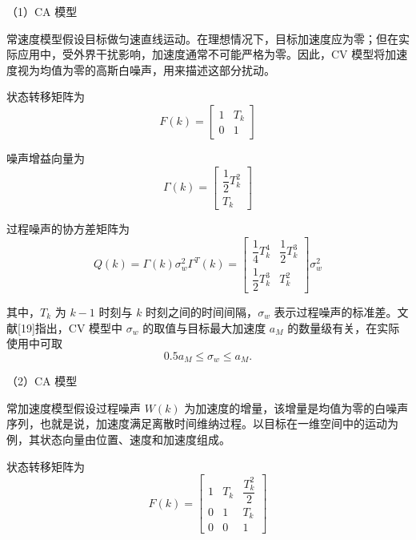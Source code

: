 \documentclass{xdupgthesis}
\begin{document}
\textnormal{（1）CA 模型}\par\vspace{0.3\baselineskip}

常速度模型假设目标做匀速直线运动。在理想情况下，目标加速度应为零；但在实际应用中，受外界干扰影响，加速度通常不可能严格为零。因此，CV 模型将加速度视为均值为零的高斯白噪声，用来描述这部分扰动。

状态转移矩阵为
\begin{equation}
	F(k)=
	\begin{bmatrix}
		1 & T_k\\
		0 & 1
	\end{bmatrix}
\end{equation}

噪声增益向量为
\begin{equation}
	\Gamma(k)=
	\begin{bmatrix}
		\dfrac{1}{2}T_k^2\\
		T_k
	\end{bmatrix}
\end{equation}

过程噪声的协方差矩阵为
\begin{equation}
	Q(k)=\Gamma(k)\sigma_w^2\Gamma^{T}(k)=
	\begin{bmatrix}
		\dfrac{1}{4}T_k^4 & \dfrac{1}{2}T_k^3\\[6pt]
		\dfrac{1}{2}T_k^3 & T_k^2
	\end{bmatrix}\sigma_w^2
\end{equation}

其中，$T_k$ 为 $k-1$ 时刻与 $k$ 时刻之间的时间间隔，$\sigma_w$ 表示过程噪声的标准差。文献[19]指出，CV 模型中 $\sigma_w$ 的取值与目标最大加速度 $a_M$ 的数量级有关，在实际使用中可取
\[
0.5a_M \leq \sigma_w \leq a_M.
\]

\textnormal{（2）CA 模型}\par\vspace{0.3\baselineskip}

常加速度模型假设过程噪声 $W(k)$ 为加速度的增量，该增量是均值为零的白噪声序列，也就是说，加速度满足离散时间维纳过程。以目标在一维空间中的运动为例，其状态向量由位置、速度和加速度组成。

状态转移矩阵为
\begin{equation}
	F(k)=
	\begin{bmatrix}
		1 & T_k & \dfrac{T_k^2}{2}\\
		0 & 1   & T_k\\
		0 & 0   & 1
	\end{bmatrix}
\end{equation}
\end{document}
